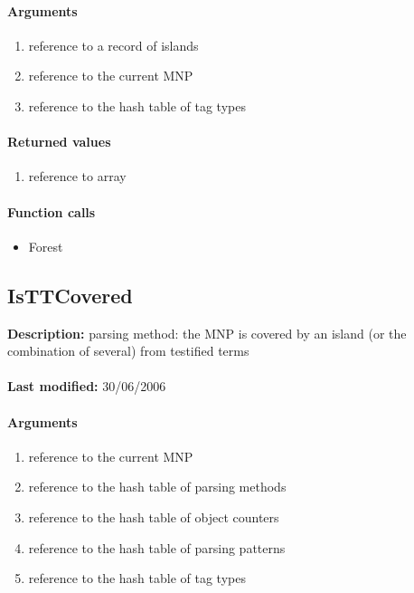 \paragraph{Arguments}
\begin{enumerate}
\item reference to a record of islands
\item reference to the current MNP
\item reference to the hash table of tag types
\end{enumerate}

\paragraph{Returned values}
\begin{enumerate}
\item reference to array
\end{enumerate}

\paragraph{Function calls}
\begin{itemize}
\item Forest
\end{itemize}

\subsection{IsTTCovered}
\textbf{Description:} parsing method: the MNP is covered by an island (or the combination of several) from testified terms\\
\\\textbf{Last modified:} 30/06/2006

\paragraph{Arguments}
\begin{enumerate}
\item reference to the current MNP
\item reference to the hash table of parsing methods
\item reference to the hash table of object counters
\item reference to the hash table of parsing patterns
\item reference to the hash table of tag types
\end{enumerate}

